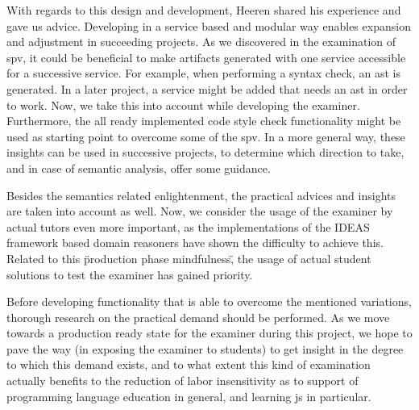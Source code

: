 With regards to this design and development, Heeren shared his experience and
gave us advice. Developing in a service based and modular way enables expansion
and adjustment in succeeding projects. As we discovered in the examination of 
\gls{spv}, it could be beneficial to make artifacts generated with one 
service accessible for a successive service. For example, when performing a
syntax check, an \gls{ast} is generated. In a later project, a service
might be added that needs an \gls{ast} in order to work. Now, we take this into
account while developing the \gls{examiner}. Furthermore, the all ready 
implemented code style check functionality might be used as starting point to
overcome some of the \gls{spv}. In a more general way, these insights can be
used in successive projects, to determine which direction to take, and in case
of semantic analysis, offer some guidance.


Besides the semantics related enlightenment, the practical advices and insights
are taken into account as well. Now, we consider the usage of the 
\gls{examiner} by actual \glspl{tutor} even more important, as the 
implementations of the IDEAS framework based domain reasoners have shown the
difficulty to achieve this. Related to this \"production phase mindfulness\", 
the usage of actual student solutions to test the \gls{examiner} has gained 
priority. 


Before developing functionality that is able to overcome the mentioned 
variations, thorough research on the practical demand should be performed. 
As we move towards a production ready state for the \gls{examiner} during
this project, we hope to pave the way (in exposing the \gls{examiner} to 
students) to get insight in the degree to which this demand exists, and to what 
extent this kind of examination actually benefits to the reduction of labor 
insensitivity as to support of programming language education in general, and 
learning \gls{js} in particular.